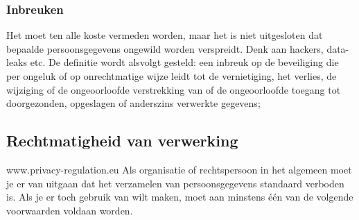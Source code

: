 \subsubsection{Inbreuken} 
Het moet ten alle koste vermeden worden, maar het is niet uitgesloten dat bepaalde persoonsgegevens ongewild worden verspreidt. Denk aan hackers, data-leaks etc. 
De definitie wordt alsvolgt gesteld: een inbreuk op de beveiliging die per ongeluk of op onrechtmatige wijze leidt tot de vernietiging, het verlies, de wijziging of de ongeoorloofde verstrekking van of de ongeoorloofde toegang tot doorgezonden, opgeslagen of anderszins verwerkte gegevens; 

\subsection{Rechtmatigheid van verwerking} www.privacy-regulation.eu
Als organisatie of rechtspersoon in het algemeen moet je er van uitgaan dat het verzamelen van persoonsgegevens standaard verboden is. Als je er toch gebruik van wilt maken, moet aan minstens één van de volgende voorwaarden voldaan worden. 
